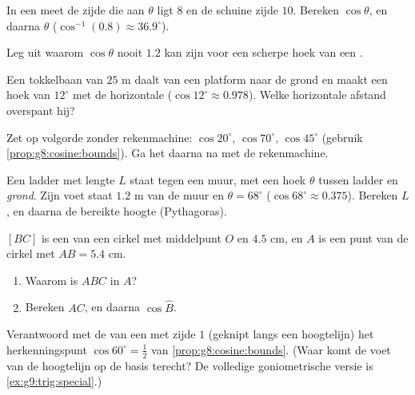 \begin{exercise}[$\star$]\label{exo:g8:cosine:5}
In een  meet de zijde die aan $\theta$ ligt $8$ en de
schuine zijde $10$. Bereken $\cos\theta$, en daarna $\theta$
($\cos^{-1}(0.8) \approx 36.9^\circ$).
\end{exercise}

\begin{exercise}[$\star$]\label{exo:g8:cosine:6}
Leg uit waarom $\cos\theta$ nooit $1.2$ kan zijn voor een scherpe hoek van een
.
\end{exercise}

\begin{exercise}[$\star\star$]\label{exo:g8:cosine:7}
Een tokkelbaan van $25$ m daalt van een platform naar de grond en maakt een hoek
van $12^\circ$ met de horizontale ($\cos 12^\circ \approx 0.978$). Welke
horizontale afstand overspant hij?
\end{exercise}

\begin{exercise}[$\star\star$]\label{exo:g8:cosine:8}
Zet op volgorde zonder rekenmachine: $\cos 20^\circ$, $\cos 70^\circ$,
$\cos 45^\circ$ (gebruik \cref{prop:g8:cosine:bounds}). Ga het daarna na met de
rekenmachine.
\end{exercise}

\begin{exercise}[$\star\star$]\label{exo:g8:cosine:9}
Een ladder met lengte $L$ staat tegen een muur, met een hoek $\theta$ tussen
ladder en \emph{grond}. Zijn voet staat $1.2$ m van de muur en
$\theta = 68^\circ$ ($\cos 68^\circ \approx 0.375$). Bereken $L$, en daarna de
bereikte hoogte (Pythagoras).
\end{exercise}

\begin{exercise}[$\star\star$]\label{exo:g8:cosine:10}
$[BC]$ is een  van een cirkel met middelpunt $O$ en  $4.5$ cm, en
$A$ is een punt van de cirkel met $AB = 5.4$ cm.
\begin{enumerate}
  \item Waarom is $ABC$  in $A$?
  \item Bereken $AC$, en daarna $\cos \widehat B$.
\end{enumerate}
\end{exercise}

\begin{exercise}[$\star\star\star$]\label{exo:g8:cosine:11}
Verantwoord met de  van een  met zijde $1$ (geknipt
langs een hoogtelijn) het herkenningspunt $\cos 60^\circ = \frac12$ van
\cref{prop:g8:cosine:bounds}. (Waar komt de voet van de hoogtelijn op de basis
terecht? De volledige goniometrische versie is \cref{ex:g9:trig:special}.)
\end{exercise}

